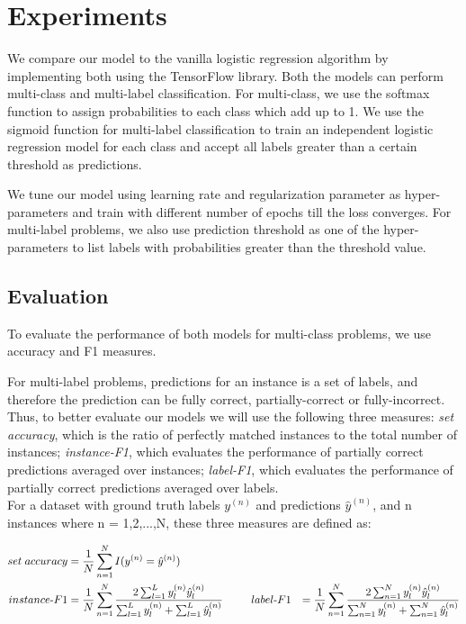 \newpage
\section{Experiments}


We compare our model to the vanilla logistic regression algorithm by implementing both using the TensorFlow library. Both the models can perform multi-class and multi-label classification. For multi-class, we use the softmax function to assign probabilities to each class which add up to 1. We use the sigmoid function for multi-label classification to train an independent logistic regression model for each class and accept all labels greater than a certain threshold as predictions.

We tune our model using learning rate and regularization parameter as hyper-parameters and train with different number of epochs till the loss converges. For multi-label problems, we also use prediction threshold as one of the hyper-parameters to list labels with probabilities greater than the threshold value.

\subsection{Evaluation}

To evaluate the performance of both models for multi-class problems, we use accuracy and F1 measures.

For multi-label problems, predictions for an instance is a set of labels, and therefore the prediction can be fully correct, partially-correct or fully-incorrect. Thus, to better evaluate our models we will use the following three measures: \textit{set accuracy}, which is the ratio of perfectly matched instances to the total number of instances; \textit{instance-F1}, which evaluates the performance of partially correct predictions averaged over instances; \textit{label-F1}, which evaluates the performance of partially correct predictions averaged over labels.\\

For a dataset with ground truth labels $y^{(n)}$ and predictions $\hat{y}^{(n)}$, and n instances where n = 1,2,...,N, these three measures are defined as:

\begin{alignat}{2}
set\; accuracy & = \frac{1}{N} \sum_{n=1}^{N} {I(y^{(n)} = \hat{y}^{(n)})}\\
instance \mbox{-} F1 & = \frac{1}{N} \sum_{n=1}^{N} \frac{2\sum_{l=1}^{L} {y^{(n)}_{l} \hat{y}^{(n)}_{l}}}{\sum_{l=1}^{L} {y^{(n)}_{l}} + \sum_{l=1}^{L} {\hat{y}^{(n)}_{l}}}
\hspace{6ex}
label \mbox{-} F1 & = \frac{1}{N} \sum_{n=1}^{N} \frac{2\sum_{n=1}^{N} {y^{(n)}_{l} \hat{y}^{(n)}_{l}}}{\sum_{n=1}^{N} {y^{(n)}_{l}} + \sum_{n=1}^{N} {\hat{y}^{(n)}_{l}}}
\end{alignat}

